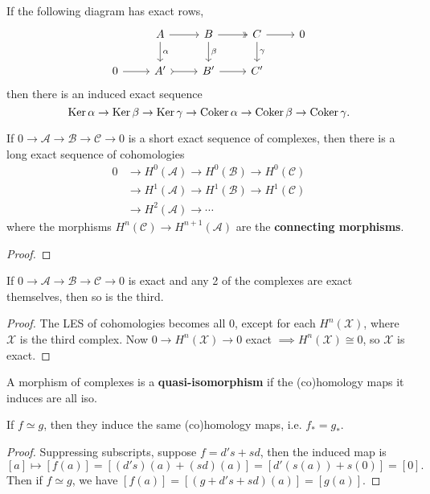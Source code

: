 \documentclass[twoside,10pt]{report}
\begin{document}
\begin{lem}
	If the following diagram has exact rows,
	\[
	\begin{tikzcd}
		& A \rar\dar{\alpha} & B \rar[two heads]\dar{\beta} & C \rar\dar{\gamma} & 0 \\
		0 \rar & A' \rar[tail] & B' \rar & C'
	\end{tikzcd}
	\] 
	then there is an induced exact sequence
	\[
		\operatorname{Ker} \alpha \to \operatorname{Ker} \beta \to \operatorname{Ker} \gamma \to \operatorname{Coker} \alpha \to \operatorname{Coker} \beta \to \operatorname{Coker} \gamma.
	\] 
\end{lem}

\begin{thrm}
If $0\to \mathcal{A}\to \mathcal{B}\to \mathcal{C}\to 0$ is a short exact sequence of complexes, then there is a long exact sequence of cohomologies
\begin{align*}
	0 &\to H^{0}(\mathcal{A})\to H^{0}(\mathcal{B})\to H^{0}(\mathcal{C}) \\
	  &\to H^{1}(\mathcal{A})\to H^{1}(\mathcal{B})\to H^{1}(\mathcal{C}) \\
	  &\to H^{2}(\mathcal{A})\to \cdots
\end{align*}
where the morphisms $H^{n}(\mathcal{C})\to H^{n+1}(\mathcal{A})$ are the \textbf{connecting morphisms}.
\end{thrm}
\begin{proof}
\end{proof}

\begin{cor}
If $0\to \mathcal{A}\to \mathcal{B}\to \mathcal{C}\to 0$ is exact and any 2 of the complexes are exact themselves, then so is the third.
\end{cor}
\begin{proof}
	The LES of cohomologies becomes all 0, except for each $H^{n}(\mathcal{X})$, where $\mathcal{X}$ is the third complex. Now $0\to H^{n}(\mathcal{X})\to 0$ exact $\implies H^{n}(\mathcal{X}) \cong 0$, so $\mathcal{X}$ is exact.
\end{proof}

\begin{defn}[]
	A morphism of complexes is a \textbf{quasi-isomorphism} if the (co)homology maps it induces are all iso.
\end{defn}

\begin{lem}
	If $f\simeq g$, then they induce the same (co)homology maps, i.e. $f_{*}=g_{*}$.
\end{lem}
\begin{proof}
	Suppressing subscripts, suppose $f = d's + sd$, then the induced map is
	\[
		[a] \mapsto [f(a)] = [(d's)(a) + (sd)(a)] = [d'(s(a)) + s(0)] = [0].
	\] Then if $f \simeq g$, we have $[f(a)] = [(g+d's+sd)(a)] = [g(a)]$.
\end{proof}
\end{document}
